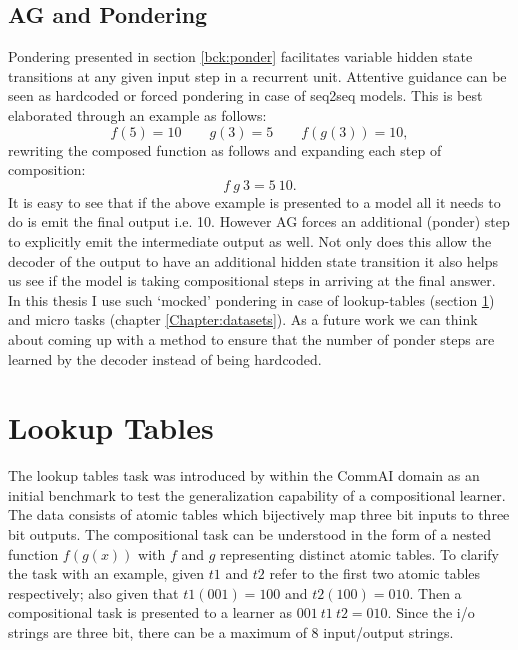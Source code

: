 \subsection{AG and Pondering} \label{pm:ag-ponder}
Pondering presented in section \ref{bck:ponder} facilitates variable hidden state transitions at any given input step in a recurrent unit. Attentive guidance can be seen as hardcoded or forced pondering in case of seq2seq models. This is best elaborated through an example as follows:
\begin{equation}
	f(5) = 10 \qquad g(3) = 5\qquad f(g(3)) = 10,
\end{equation}
rewriting the composed function as follows and expanding each step of composition:
\begin{equation}
	f\ g\ 3 = 5\ 10.
\end{equation}
It is easy to see that if the above example is presented to a model all it needs to do is emit the final output i.e. 10. However AG forces an additional (ponder) step to explicitly emit the intermediate output as well. Not only does this allow the decoder of the output to have an additional hidden state transition it also helps us see if the model is taking compositional steps in arriving at the final answer. In this thesis I use such \lq mocked\rq{} pondering in case of lookup-tables (section \ref{datasets:lt}) and micro tasks (chapter \ref{Chapter:datasets}). As a future work we can think about coming up with a method to ensure that the number of ponder steps are learned by the decoder instead of being hardcoded.

\section{Lookup Tables} \label{datasets:lt}

The lookup tables task was introduced by \cite{Liska2018} within the CommAI domain \citep{Baroni2017} as an initial benchmark to test the generalization capability of a compositional learner. The data consists of atomic tables which bijectively map three bit inputs to three bit outputs. The compositional task can be understood in the form of a nested function $f(g(x))$ with $f$ and $g$ representing distinct atomic tables. To clarify the task with an example, given $t1$ and $t2$ refer to the first two atomic tables respectively; also given that $t1(001) = 100$ and $t2(100) = 010$. Then a compositional task is presented to a learner as $001\ t1\ t2 = 010$. Since the i/o strings are three bit, there can be a maximum of 8 input/output strings.

